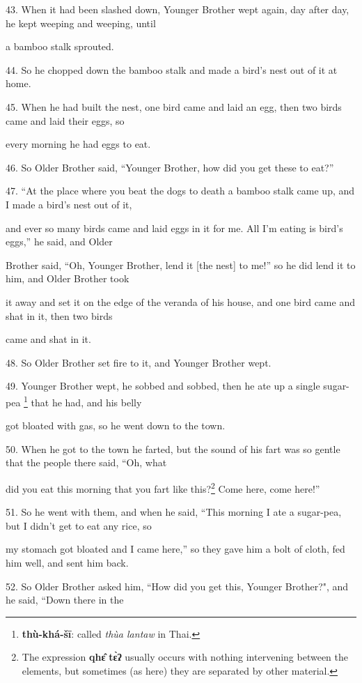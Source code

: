 43. When it had been slashed down, Younger Brother wept again, day after day, he
kept weeping and weeping, until

a bamboo stalk sprouted.

44. So he chopped down the bamboo stalk and made a bird's nest out of it at home.

45. When he had built the nest, one bird came and laid an egg, then two birds came
and laid their eggs, so

every morning he had eggs to eat.

46. So Older Brother said, ``Younger Brother, how did you get these to eat?''

47. ``At the place where you beat the dogs to death a bamboo stalk came up, and
I made a bird's nest out of it,

and ever so many birds came and laid eggs in it for me. All I'm eating is bird's
eggs,'' he said, and Older

Brother said, ``Oh, Younger Brother, lend it [the nest] to me!'' so he did lend
it to him, and Older Brother took

it away and set it on the edge of the veranda of his house, and one bird came and
shat in it, then two birds

came and shat in it.

48. So Older Brother set fire to it, and Younger Brother wept.

49. Younger Brother wept, he sobbed and sobbed, then he ate up a single sugar-pea
\footnote{\textbf{thù-khá-šī}: called \textit{thùa lantaw} in Thai.} that he had, and his belly

got bloated with gas, so he went down to the town.

50. When he got to the town he farted, but the sound of his fart was so gentle
that the people there said, ``Oh, what

did you eat this morning that you fart like this?\footnote{The expression \textbf{qhɛ̂} \textbf{tɛ̀ʔ} usually occurs with nothing intervening between the elements, but sometimes (as here) they are separated by other material.} Come here, come here!''

51. So he went with them, and when he said, ``This morning I ate a sugar-pea, but
I didn't get to eat any rice, so

my stomach got bloated and I came here,'' so they gave him a bolt of cloth, fed
him well, and sent him back.

52. So Older Brother asked him, ``How did you get this, Younger Brother?",
and he said, ``Down there in the

